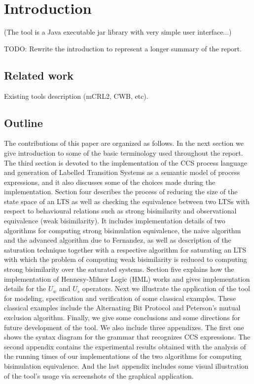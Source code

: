 \section{Introduction}

(The tool is a Java executable jar library with very simple user interface...)

TODO: Rewrite the introduction to represent a longer summary of the report. 

\subsection{Related work} Existing tools description (mCRL2, CWB, etc).
 
\subsection{Outline} The contributions of this paper are organized as follows. In the next section we give introduction to some of the basic terminology used throughout the report. The third section is devoted to the implementation of the CCS process language and generation of Labelled Transition Systems as a semantic model of process expressions, and it also discusses some of the choices made during the implementation. Section four describes the process of reducing the size of the state space of an LTS as well as checking the equivalence between two LTSs with respect to behavioural relations such as strong bisimilarity and observational equivalence (weak bisimilarity). It includes implementation details of two algorithms for computing strong bisimulation equivalence, the naive algorithm and the advanced algorithm due to Fernandez, as well as description of the saturation technique together with a respective algorithm  for saturating an LTS with which the problem of computing weak bisimilarity is reduced to computing strong bisimilarity over the saturated systems. Section five explains how the implementation of Hennesy-Milner Logic (HML) works and gives implementation details for the $U_{w}$ and $U_{s}$ operators. Next we illustrate the application of the tool for modeling, specification and verification of some classical examples. These classical examples include the Alternating Bit Protocol and Peterson's mutual exclusion algorithm. Finally, we give some conclusions and some directions for future development of the tool. We also include three appendixes. The first one shows the syntax diagram for the grammar that recognizes CCS expressions. The second appendix contains the experimental results obtained with the analysis of the running times of our implementations of the two algorithms for computing bisimulation equivalence. And the last appendix includes some visual illustration of the tool's usage via screenshots of the graphical application.
